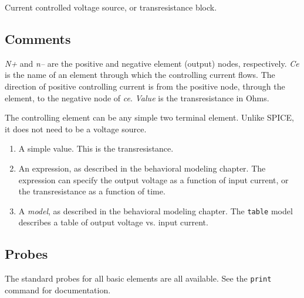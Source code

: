 Current controlled voltage source, or transresistance block.
\subsection{Comments}

{\it N+} and {\it n--} are the positive and negative element (output)
nodes, respectively.  {\it Ce} is the name of an element through
which the controlling current flows.  The direction of positive
controlling current is from the positive node, through the element,
to the negative node of {\it ce}.  {\it Value} is the transresistance
in Ohms.

The controlling element can be any simple two terminal element.
Unlike SPICE, it does not need to be a voltage source.

\begin{enumerate}
  
\item
A simple value.  This is the transresistance.
  
\item
An expression, as described in the behavioral modeling chapter.  The
expression can specify the output voltage as a function of input
current, or the transresistance as a function of time.

\item
A {\it model}, as described in the behavioral modeling chapter.  The
{\tt table} model describes a table of output voltage vs. input
current.

\end{enumerate}
\subsection{Probes}

The standard probes for all basic elements are all available.  See the
{\tt print} command for documentation.
